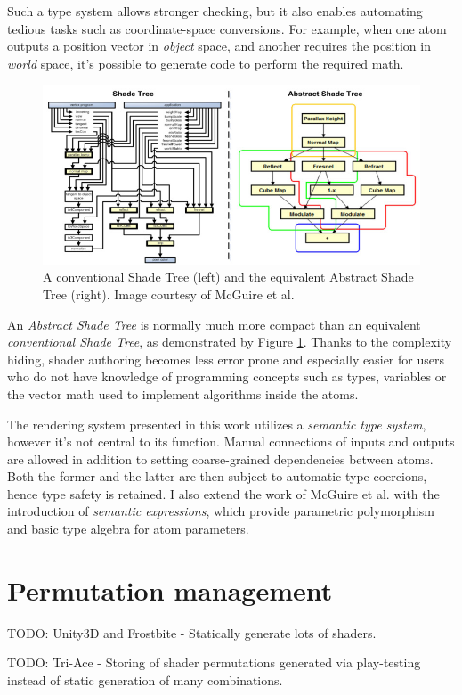 Such a type system allows stronger checking, but it also enables automating tedious tasks such as coordinate-space conversions. For example, when one atom outputs a position vector in \emph{object} space, and another requires the position in \emph{world} space, it's possible to generate code to perform the required math.

\begin{figure}[h!]
  \centering
    \includegraphics[width=0.9\linewidth]{./Chapters/AbstractShadeTree.jpg}
    \caption[Abstract Shade Tree]{A conventional Shade Tree (left) and the equivalent Abstract Shade Tree (right). Image courtesy of McGuire et al.}
  \label{fig:AbstractShadeTree}
\end{figure}

An \emph{Abstract Shade Tree} is normally much more compact than an equivalent \emph{conventional Shade Tree}, as demonstrated by Figure \ref{fig:AbstractShadeTree}. Thanks to the complexity hiding, shader authoring becomes less error prone and especially easier for users who do not have knowledge of programming concepts such as types, variables or the vector math used to implement algorithms inside the atoms.
 

The rendering system presented in this work utilizes a \emph{semantic type system}, however it's not central to its function. Manual connections of inputs and outputs are allowed in addition to setting coarse-grained dependencies between atoms. Both the former and the latter are then subject to automatic type coercions, hence type safety is retained. I also extend the work of McGuire et al. with the introduction of \emph{semantic expressions}, which provide parametric polymorphism and basic type algebra for atom parameters.

\section{Permutation management}

TODO: Unity3D and Frostbite - Statically generate lots of shaders.

TODO: Tri-Ace - Storing of shader permutations generated via play-testing instead of static generation of many combinations.
